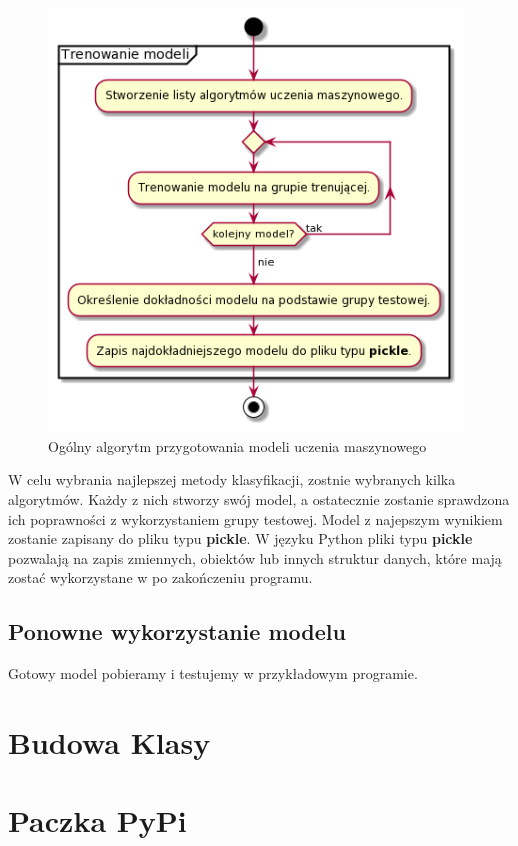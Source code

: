     \begin{figure}[H]
        \begin{center}
            \includegraphics[width=11cm]{../images/train_models.png}
            \caption{Ogólny algorytm przygotowania modeli uczenia maszynowego}
        \end{center}
    \end{figure}
    
    \quad W celu wybrania najlepszej metody klasyfikacji, zostnie wybranych kilka algorytmów. Każdy z nich stworzy swój model, a ostatecznie zostanie sprawdzona ich poprawności z wykorzystaniem grupy testowej. Model z najepszym wynikiem zostanie zapisany do pliku typu \textbf{pickle}. W języku Python pliki typu \textbf{pickle} pozwalają na zapis zmiennych, obiektów lub innych struktur danych, które mają zostać wykorzystane w po zakończeniu programu. 
    
    \subsection{Ponowne wykorzystanie modelu}
    
    \quad Gotowy model pobieramy i testujemy w przykładowym programie. 

    \section{Budowa Klasy}
    
    \section{Paczka PyPi}

